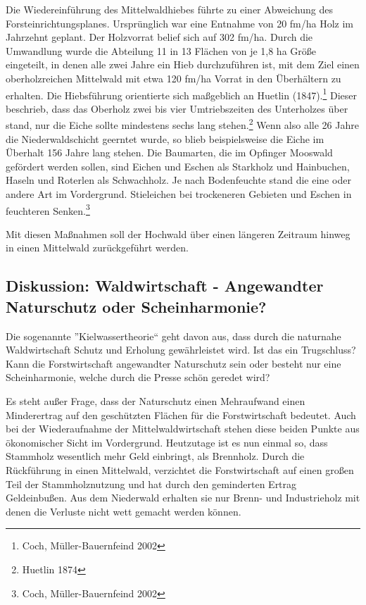 \documentclass[12pt]{article}
\begin{document}
Die Wiedereinführung des Mittelwaldhiebes führte zu einer Abweichung des Forsteinrichtungsplanes.
Ursprünglich war eine Entnahme von 20 fm/ha Holz im Jahrzehnt geplant. Der Holzvorrat belief sich auf 302 fm/ha. 
Durch die Umwandlung wurde die Abteilung 11 in 13 Flächen von je 1,8 ha Größe eingeteilt, in denen alle zwei 
Jahre ein Hieb durchzuführen ist, mit dem Ziel einen oberholzreichen Mittelwald mit etwa 120 fm/ha Vorrat in den
Überhältern zu erhalten. Die Hiebsführung orientierte sich maßgeblich an Huetlin (1847).\footnote{Coch, Müller-Bauernfeind 2002} Dieser beschrieb, dass
das Oberholz zwei bis vier Umtriebszeiten des Unterholzes über stand, nur die Eiche sollte mindestens sechs lang 
stehen.\footnote{Huetlin 1874} Wenn also alle 26 Jahre die Niederwaldschicht geerntet wurde, so blieb beispielsweise die Eiche im Überhalt 
156 Jahre lang stehen. Die Baumarten, die im Opfinger Mooswald gefördert werden sollen, sind Eichen und Eschen
als Starkholz und Hainbuchen, Haseln und Roterlen als Schwachholz. Je nach Bodenfeuchte stand die eine oder andere
Art im Vordergrund. Stieleichen bei trockeneren Gebieten und Eschen in feuchteren Senken.\footnote{Coch, Müller-Bauernfeind 2002}

Mit diesen Maßnahmen soll der Hochwald über einen längeren Zeitraum hinweg in einen Mittelwald zurückgeführt werden.


\subsection*{Diskussion: Waldwirtschaft - Angewandter Naturschutz oder Scheinharmonie?}
Die sogenannte ''Kielwassertheorie`` geht davon aus, dass durch die naturnahe Waldwirtschaft
Schutz und Erholung gewährleistet wird. Ist das ein Trugschluss? Kann die Forstwirtschaft 
angewandter Naturschutz sein oder besteht nur eine Scheinharmonie, welche durch die Presse 
schön geredet wird?

Es steht außer Frage, dass der Naturschutz einen Mehraufwand einen Minderertrag auf den
geschützten Flächen für die Forstwirtschaft bedeutet. Auch bei der Wiederaufnahme der 
Mittelwaldwirtschaft stehen diese beiden Punkte aus ökonomischer Sicht im Vordergrund. 
Heutzutage ist es nun einmal so, dass Stammholz wesentlich mehr Geld einbringt, als Brennholz.
Durch die Rückführung in einen Mittelwald, verzichtet die Forstwirtschaft auf einen
großen Teil der Stammholznutzung und hat durch den geminderten Ertrag Geldeinbußen. Aus dem
Niederwald erhalten sie nur Brenn- und Industrieholz mit denen die Verluste nicht wett gemacht 
werden können. 
\end{document}
